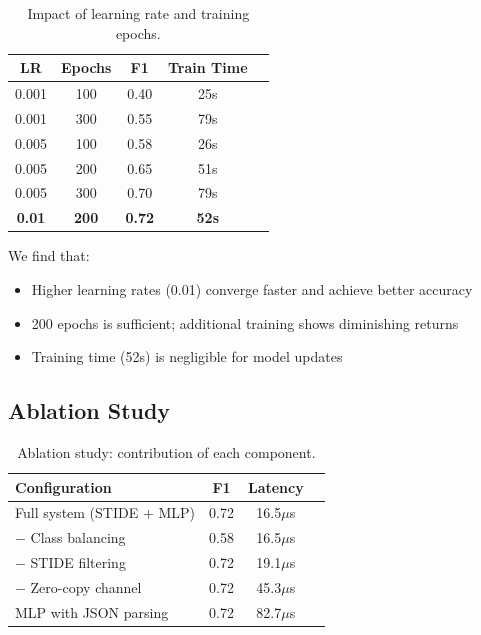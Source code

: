 \begin{table}[t]
\centering
\caption{Impact of learning rate and training epochs.}
\label{tab:hyperparams}
\begin{tabular}{ccccc}
\toprule
\textbf{LR} & \textbf{Epochs} & \textbf{F1} & \textbf{Train Time} \\
\midrule
0.001 & 100 & 0.40 & 25s \\
0.001 & 300 & 0.55 & 79s \\
0.005 & 100 & 0.58 & 26s \\
0.005 & 200 & 0.65 & 51s \\
0.005 & 300 & 0.70 & 79s \\
\textbf{0.01} & \textbf{200} & \textbf{0.72} & \textbf{52s} \\
\bottomrule
\end{tabular}
\end{table}

We find that:
\begin{itemize}
    \item Higher learning rates (0.01) converge faster and achieve better accuracy
    \item 200 epochs is sufficient; additional training shows diminishing returns
    \item Training time (52s) is negligible for model updates
\end{itemize}

\subsection{Ablation Study}

\begin{table}[t]
\centering
\caption{Ablation study: contribution of each component.}
\label{tab:ablation}
\begin{tabular}{lccc}
\toprule
\textbf{Configuration} & \textbf{F1} & \textbf{Latency} \\
\midrule
Full system (STIDE + MLP) & 0.72 & 16.5$\mu$s \\
\quad $-$ Class balancing & 0.58 & 16.5$\mu$s \\
\quad $-$ STIDE filtering & 0.72 & 19.1$\mu$s \\
\quad $-$ Zero-copy channel & 0.72 & 45.3$\mu$s \\
MLP with JSON parsing & 0.72 & 82.7$\mu$s \\
\bottomrule
\end{tabular}
\end{table}

